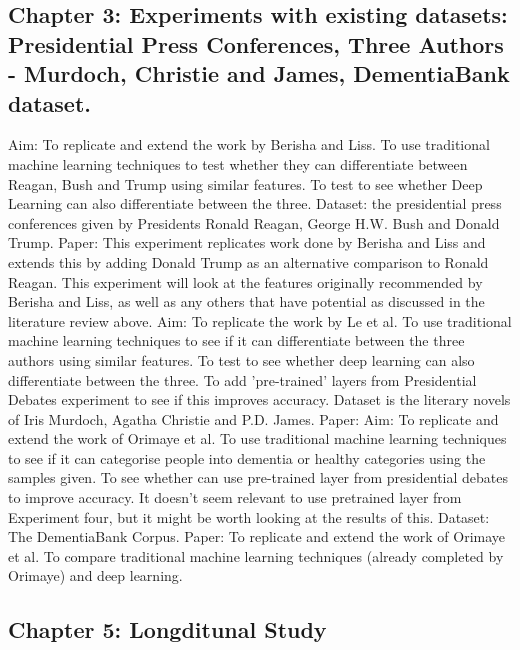 \documentclass{article}
\begin{document}
\subsection{Chapter 3: Experiments with existing datasets: Presidential Press Conferences, Three Authors - Murdoch, Christie and James, DementiaBank dataset.}
Aim: To replicate and extend the work by Berisha and Liss. To use traditional machine learning techniques to test whether they can differentiate between Reagan, Bush and Trump using similar features. To test to see whether Deep Learning can also differentiate between the three. \newline
Dataset: the presidential press conferences given by Presidents Ronald Reagan, George H.W. Bush and Donald Trump. \newline
Paper: This experiment replicates work done by Berisha and Liss and extends this by adding Donald Trump as an alternative comparison to Ronald Reagan. This experiment will look at the features originally recommended by Berisha and Liss, as well as any others that have potential as discussed in the literature review above. \newline
Aim: To replicate the work by Le et al. To use traditional machine learning techniques to see if it can differentiate between the three authors using similar features. To test to see whether deep learning can also differentiate between the three. To add 'pre-trained' layers from Presidential Debates experiment to see if this improves accuracy. \newline
Dataset is the literary novels of Iris Murdoch, Agatha Christie and P.D. James. \newline
Paper:
Aim: To replicate and extend the work of Orimaye et al. To use traditional machine learning techniques to see if it can categorise people into dementia or healthy categories using the samples given. To see whether can use pre-trained layer from presidential debates to improve accuracy. It doesn't seem relevant to use pretrained layer from Experiment four, but it might be worth looking at the results of this. \newline
Dataset: The DementiaBank Corpus. \newline
Paper: To replicate and extend the work of Orimaye et al. To compare traditional machine learning techniques (already completed by Orimaye) and deep learning. \newline

\subsection{Chapter 5: Longditunal Study}
\end{document}
